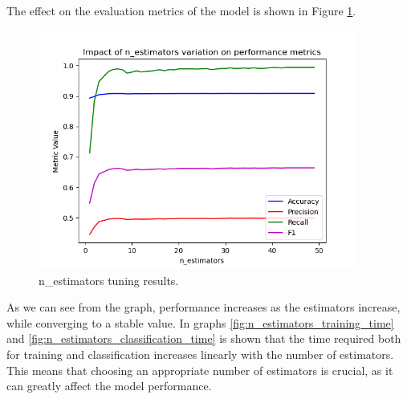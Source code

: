 \documentclass[futureinternet,article,submit,pdftex,moreauthors]{Definitions/mdpi}
\begin{document}
The effect on the evaluation metrics of the model is shown in Figure \ref{fig:n_estimators_tuning}.

\begin{figure}[H]
	\includegraphics[width=10.5cm]{img/nEstimatorsTuning.png}
	\caption{n\_estimators tuning results.}\label{fig:n_estimators_tuning}
\end{figure}
\unskip

As we can see from the graph, performance increases as the estimators increase, while converging to a stable value. 
In graphs \ref{fig:n_estimators_training_time} and \ref{fig:n_estimators_classification_time} is shown that the time required both for training and classification increases linearly with the number of estimators.
This means that choosing an appropriate number of estimators is crucial, as it can greatly affect the model performance. 
\end{document}
